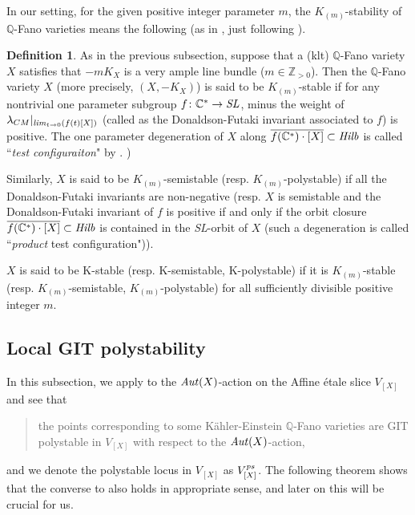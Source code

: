 \documentclass[12pt]{amsart}
\theoremstyle{remark}
\theoremstyle{definition}
\newtheorem{Def}[Thm]{Definition}
\begin{document}
In our setting, for the given positive integer parameter $m$, 
the $K_{(m)}$-stability of $\mathbb{Q}$-Fano varieties means 
the following (as in \cite{Od2}, just following \cite{Don0}). 

\begin{Def}
As in the previous subsection, 
suppose that a (klt) $\mathbb{Q}$-Fano variety $X$ satisfies that $-mK_{X}$ is a 
very ample line bundle ($m\in \mathbb{Z}_{>0}$). Then the $\mathbb{Q}$-Fano variety 
$X$ (more precisely, $(X,-K_{X})$) is said to be $K_{(m)}$-stable 
if for any nontrivial one parameter subgroup $f\colon \mathbb{C}^{*}\to {\it SL}$, 
minus the weight of $\lambda_{CM}|_{{\it lim}_{t\to 0}(f(t)[X])}$ (called as the Donaldson-Futaki invariant associated to $f$) is positive. The one parameter degeneration of $X$ along 
$\overline{f(\mathbb{C}^{*})\cdot [X]}\subset {\it Hilb}$ is called 
``\textit{test configuraiton}" by \cite{Don0}. )

Similarly, $X$ is said to be $K_{(m)}$-semistable (resp. $K_{(m)}$-polystable) if 
all the Donaldson-Futaki invariants are non-negative (resp. $X$ is semistable and 
the Donaldson-Futaki invariant of $f$ is positive if and only if the orbit closure 
$\overline{f(\mathbb{C}^{*})\cdot [X]}\subset {\it Hilb}$ is contained 
in the {\it SL}-orbit of $X$ (such a 
degeneration is called ``\textit{product} test configuration")). 

$X$ is said to be K-stable (resp. K-semistable, K-polystable) if it is $K_{(m)}$-stable 
 (resp. $K_{(m)}$-semistable, $K_{(m)}$-polystable) 
for all sufficiently divisible positive integer $m$. 
\end{Def}

\subsection{Local GIT polystability}\label{local.GIT.sec}

In this subsection, we apply \cite[Lemma 3.6]{OSS} to the ${\it Aut}(X)$-action on the Affine \'{e}tale slice $V_{[X]}$ and see that 

\begin{quotation}
the points 
corresponding to some 
K\"ahler-Einstein $\mathbb{Q}$-Fano varieties are GIT polystable in $V_{[X]}$ 
with respect to the ${\it Aut}(X)$-action, 
\end{quotation}
and we denote the polystable locus in $V_{[X]}$ as $V_{[X]}^{{\it ps}}$. 
The following theorem shows that the converse to \cite[Lemma 3.6]{OSS} also holds in 
appropriate sense, and later on this will be crucial for us. 
\end{document}
